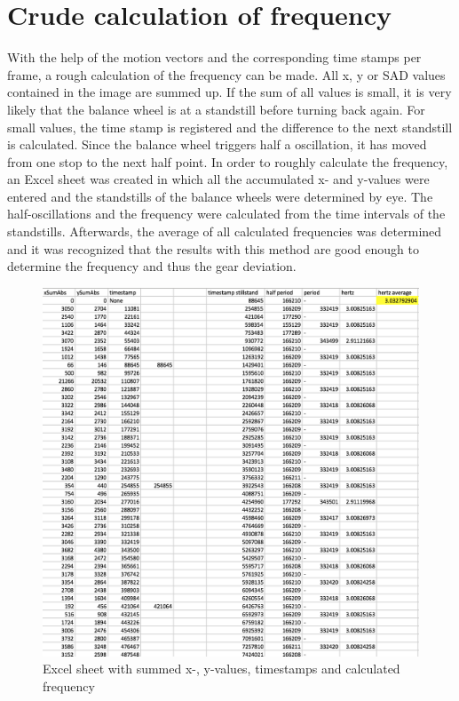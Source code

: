 \documentclass[12pt, a4paper]{report}
\begin{document}
    \section{Crude calculation of frequency}
    With the help of the motion vectors and the corresponding time stamps per frame, a rough calculation of the frequency can be made. All x, y or SAD values contained in the image are summed up. If the sum of all values is small, it is very likely that the balance wheel is at a standstill before turning back again. For small values, the time stamp is registered and the difference to the next standstill is calculated. Since the balance wheel triggers half a oscillation, it has moved from one stop to the next half point. 
    In order to roughly calculate the frequency, an Excel sheet was created in which all the accumulated x- and y-values were entered and the standstills of the balance wheels were determined by eye. The half-oscillations and the frequency were calculated from the time intervals of the standstills. Afterwards, the average of all calculated frequencies was determined and it was recognized that the results with this method are good enough to determine the frequency and thus the gear deviation. 
    
    \noindent
    \begin{figure}[H]
    \centering
    \includegraphics[scale=0.7]{Images/excel_sheet_numbers.png}
    
    \caption{Excel sheet with summed x-, y-values, timestamps and calculated frequency}
    \end{figure}
\end{document}
